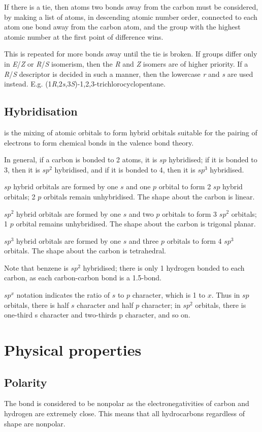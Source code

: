 \documentclass[Chemistry.tex]{subfiles}
\begin{document}
If there is a tie, then atoms two bonds away from the carbon must be considered, by making a list of atoms, in descending atomic number order, connected to each atom one bond away from the carbon atom, and the group with the highest atomic number at the first point of difference wins.

This is repeated for more bonds away until the tie is broken. If groups differ only in \emph{E}/\emph{Z} or \emph{R}/\emph{S} isomerism, then the \emph{R} and \emph{Z} isomers are of higher priority. If a \emph{R}/\emph{S} descriptor is decided in such a manner, then the lowercase \emph{r} and \emph{s} are used instead. E.g. (1\emph{R},2\emph{s},3\emph{S})-1,2,3-trichlorocyclopentane.
\subsection{Hybridisation}
 is the mixing of atomic orbitals to form hybrid orbitals suitable for the pairing of electrons to form chemical bonds in the valence bond theory.

In general, if a carbon is bonded to 2 atoms, it is \(sp\) hybridised; if it is bonded to 3, then it is \(sp^2\) hybridised, and if it is bonded to 4, then it is \(sp^3\) hybridised.

\(sp\) hybrid orbitals are formed by one \(s\) and one \(p\) orbital to form 2 \(sp\) hybrid orbitals; 2 \(p\) orbitals remain unhybridised. The shape about the carbon is linear.

\(sp^2\) hybrid orbitals are formed by one \(s\) and two \(p\) orbitals to form 3 \(sp^2\) orbitals; 1 \(p\) orbital remains unhybridised. The shape about the carbon is trigonal planar.

\(sp^3\) hybrid orbitals are formed by one \(s\) and three \(p\) orbitals to form 4 \(sp^3\) orbitals. The shape about the carbon is tetrahedral.

Note that benzene is \(sp^2\) hybridised; there is only 1 hydrogen bonded to each carbon, as each carbon-carbon bond is a 1.5-bond.

\(sp^x\) notation indicates the ratio of \(s\) to \(p\) character, which is 1 to \(x\). Thus in \(sp\) orbitals, there is half \(s\) character and half \(p\) character; in \(sp^2\) orbitals, there is one-third s character and two-thirds p character, and so on.
\section{Physical properties}
\subsection{Polarity}
The  bond is considered to be nonpolar as the electronegativities of carbon and hydrogen are extremely close. This means that all hydrocarbons regardless of shape are nonpolar.
\end{document}
